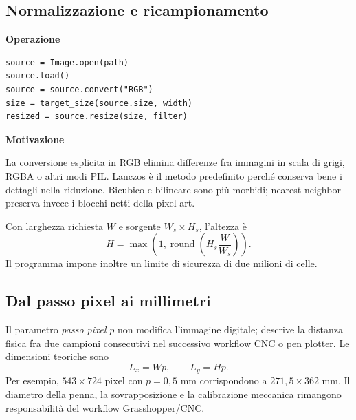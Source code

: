 \documentclass[11pt,a4paper]{article}
\begin{document}
\subsection{Normalizzazione e ricampionamento}
\noindent\begin{minipage}[t]{0.47\textwidth}
\textbf{Operazione}
\begin{lstlisting}[style=py]
source = Image.open(path)
source.load()
source = source.convert("RGB")
size = target_size(source.size, width)
resized = source.resize(size, filter)
\end{lstlisting}
\end{minipage}\hfill
\begin{minipage}[t]{0.49\textwidth}
\textbf{Motivazione}\par\smallskip
La conversione esplicita in RGB elimina differenze fra immagini in scala di grigi, RGBA o altri modi PIL. Lanczos è il metodo predefinito perché conserva bene i dettagli nella riduzione. Bicubico e bilineare sono più morbidi; nearest-neighbor preserva invece i blocchi netti della pixel art.
\end{minipage}

Con larghezza richiesta $W$ e sorgente $W_s\times H_s$, l'altezza è
\[H=\max\left(1,\operatorname{round}\left(H_s\frac{W}{W_s}\right)\right).\]
Il programma impone inoltre un limite di sicurezza di due milioni di celle.

\subsection{Dal passo pixel ai millimetri}
Il parametro \emph{passo pixel} $p$ non modifica l'immagine digitale; descrive la distanza fisica fra due campioni consecutivi nel successivo workflow CNC o pen plotter. Le dimensioni teoriche sono
\[L_x=W p,\qquad L_y=H p.\]
Per esempio, $543\times724$ pixel con $p=0{,}5$ mm corrispondono a $271{,}5\times362$ mm. Il diametro della penna, la sovrapposizione e la calibrazione meccanica rimangono responsabilità del workflow Grasshopper/CNC.
\end{document}
